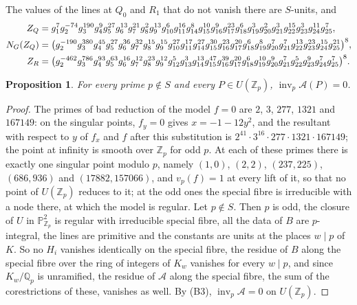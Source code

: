 \documentclass[11pt]{article}
\newtheorem{proposition}[theorem]{Proposition}
\newcommand{\Z}{\mathbb{Z}}
\newcommand{\Q}{\mathbb{Q}}
\newcommand{\inv}{\operatorname{inv}}
\begin{document}
The values of the lines at $Q_0$ and $R_1$ that do not vanish there are $S$-units, and
{\small
\begin{align}\label{eq:Z}
Z_Q&=g_{1}^{7}g_{2}^{-74}g_{3}^{190}g_{4}^{9}g_{5}^{27}g_{6}^{13}g_{7}^{21}g_{8}^{2}g_{9}^{13}g_{10}^{6}g_{11}^{16}g_{14}^{8}g_{15}^{10}g_{16}^{9}g_{17}^{23}g_{18}^{6}g_{19}^{3}g_{20}^{2}g_{21}^{3}g_{22}^{15}g_{23}^{3}g_{24}^{11}g_{25}^{7},\notag\\
N_G(Z_Q)&=\bigl(g_{2}^{-190}g_{3}^{380}g_{4}^{45}g_{5}^{27}g_{6}^{36}g_{7}^{32}g_{8}^{15}g_{9}^{15}g_{10}^{27}g_{11}^{17}g_{14}^{27}g_{15}^{30}g_{16}^{23}g_{17}^{20}g_{18}^{6}g_{19}^{8}g_{20}^{7}g_{21}^{7}g_{22}^{13}g_{23}^{23}g_{24}^{15}g_{25}^{21}\bigr)^8,\\
Z_R&=\bigl(g_{2}^{-462}g_{3}^{786}g_{4}^{93}g_{5}^{63}g_{6}^{16}g_{7}^{12}g_{8}^{23}g_{9}^{12}g_{12}^{5}g_{13}^{3}g_{14}^{13}g_{15}^{47}g_{16}^{39}g_{17}^{20}g_{18}^{6}g_{19}^{10}g_{20}^{9}g_{21}^{7}g_{22}^{5}g_{23}^{9}g_{24}^{7}g_{25}^{7}\bigr)^8.\notag
\end{align}
}

\begin{proposition}\label{prop:outside}
For every prime $p\notin S$ and every $P\in U(\Z_p)$, $\inv_p\mathcal A(P)=0$.
\end{proposition}

\begin{proof}
The primes of bad reduction of the model $f=0$ are $2$, $3$, $277$, $1321$ and $167149$: on the singular points, $f_y=0$ gives $x=-1-12y^2$, and the resultant with respect to $y$ of $f_x$ and $f$ after this substitution is $2^{41}\cdot3^{16}\cdot277\cdot1321\cdot167149$; the point at infinity is smooth over $\Z_p$ for odd $p$. At each of these primes there is exactly one singular point modulo $p$, namely $(1,0)$, $(2,2)$, $(237,225)$, $(686,936)$ and $(17882,157066)$, and $v_p(f)=1$ at every lift of it, so that no point of $U(\Z_p)$ reduces to it; at the odd ones the special fibre is irreducible with a node there, at which the model is regular. Let $p\notin S$. Then $p$ is odd, the closure of $U$ in $\mathbb P^2_{\Z_p}$ is regular with irreducible special fibre, all the data of $B$ are $p$-integral, the lines are primitive and the constants are units at the places $w\mid p$ of $K$. So no $H_i$ vanishes identically on the special fibre, the residue of $B$ along the special fibre over the ring of integers of $K_w$ vanishes for every $w\mid p$, and since $K_w/\Q_p$ is unramified, the residue of $\mathcal A$ along the special fibre, the sum of the corestrictions of these, vanishes as well. By (B3), $\inv_p\mathcal A=0$ on $U(\Z_p)$.
\end{proof}
\end{document}
